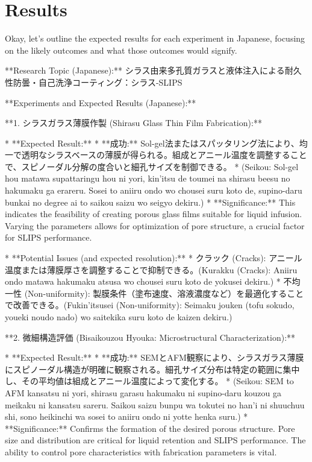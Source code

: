 \documentclass{article}
\begin{document}
\section{Results}
Okay, let's outline the expected results for each experiment in Japanese, focusing on the likely outcomes and what those outcomes would signify.

**Research Topic (Japanese):** シラス由来多孔質ガラスと液体注入による耐久性防曇・自己洗浄コーティング：シラス-SLIPS

**Experiments and Expected Results (Japanese):**

**1. シラスガラス薄膜作製 (Shirasu Glass Thin Film Fabrication):**

*   **Expected Result:**
    *   **成功:** Sol-gel法またはスパッタリング法により、均一で透明なシラスベースの薄膜が得られる。組成とアニール温度を調整することで、スピノーダル分解の度合いと細孔サイズを制御できる。
    *   (Seikou: Sol-gel hou matawa supattaringu hou ni yori, kin'itsu de toumei na shirasu beesu no hakumaku ga erareru. Sosei to aniiru ondo wo chousei suru koto de, supino-daru bunkai no degree ai to saikou saizu wo seigyo dekiru.)
    *   **Significance:** This indicates the feasibility of creating porous glass films suitable for liquid infusion.  Varying the parameters allows for optimization of pore structure, a crucial factor for SLIPS performance.

*   **Potential Issues (and expected resolution):**
    *   クラック (Cracks): アニール温度または薄膜厚さを調整することで抑制できる。(Kurakku (Cracks): Aniiru ondo matawa hakumaku atsusa wo chousei suru koto de yokusei dekiru.)
    *   不均一性 (Non-uniformity): 製膜条件（塗布速度、溶液濃度など）を最適化することで改善できる。(Fukin'itsusei (Non-uniformity): Seimaku jouken (tofu sokudo, youeki noudo nado) wo saitekika suru koto de kaizen dekiru.)

**2. 微細構造評価 (Bisaikouzou Hyouka: Microstructural Characterization):**

*   **Expected Result:**
    *   **成功:** SEMとAFM観察により、シラスガラス薄膜にスピノーダル構造が明確に観察される。細孔サイズ分布は特定の範囲に集中し、その平均値は組成とアニール温度によって変化する。
    *   (Seikou: SEM to AFM kansatsu ni yori, shirasu garasu hakumaku ni supino-daru kouzou ga meikaku ni kansatsu sareru. Saikou saizu bunpu wa tokutei no han'i ni shuuchuu shi, sono heikinchi wa sosei to aniiru ondo ni yotte henka suru.)
    *   **Significance:**  Confirms the formation of the desired porous structure. Pore size and distribution are critical for liquid retention and SLIPS performance. The ability to control pore characteristics with fabrication parameters is vital.
\end{document}
